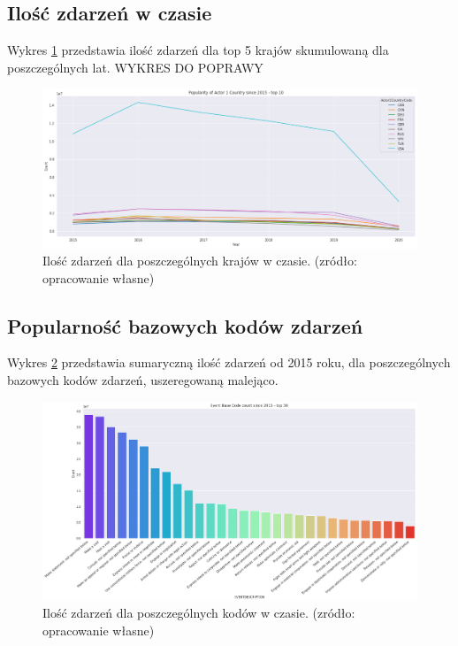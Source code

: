 \documentclass[11pt]{report}
\begin{document}
 \subsection{Ilość zdarzeń w czasie}
 Wykres \ref{fig:GLOBALactor1inTime} przedstawia ilość zdarzeń dla top 5 krajów skumulowaną dla poszczególnych lat.
 WYKRES DO POPRAWY
 	  \begin{figure}[ht]
	\centering
	\includegraphics[width=0.8 \textwidth]{fig/GLOBAL/Actor1inTIME.png}
	\caption{Ilość zdarzeń dla poszczególnych krajów w czasie. (zródło: opracowanie własne)}
	\label{fig:GLOBALactor1inTime}
	\end{figure}
 
 \subsection{Popularność bazowych kodów zdarzeń}
  	Wykres \ref{fig:GLOBALEBC} przedstawia sumaryczną ilość zdarzeń od 2015 roku, dla poszczególnych bazowych kodów zdarzeń, uszeregowaną malejąco.
  	  \begin{figure}[ht]
	\centering
	\includegraphics[width=0.8 \textwidth]{fig/GLOBAL/EBC.png}
	\caption{Ilość zdarzeń dla poszczególnych kodów w czasie. (zródło: opracowanie własne)}
	\label{fig:GLOBALEBC}
	\end{figure}
	
\end{document}
